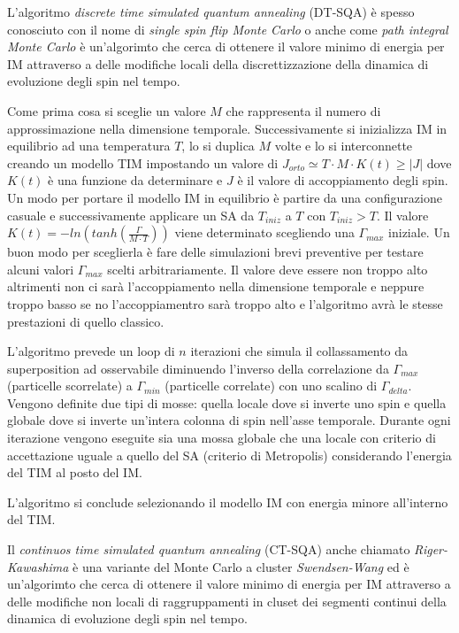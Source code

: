 L'algoritmo \textit{discrete time simulated quantum annealing} (DT-SQA)\cite{QVC} è spesso conosciuto con il nome di \textit{single spin flip Monte Carlo} o anche come \textit{path integral Monte Carlo}\cite{PIMC} è un'algorimto che cerca di ottenere il valore minimo di energia per IM attraverso a delle modifiche locali della discrettizzazione della dinamica di evoluzione degli spin nel tempo.

Come prima cosa si sceglie un valore $M$ che rappresenta il numero di approssimazione nella dimensione temporale.
Successivamente si inizializza IM in equilibrio ad una temperatura $T$, lo si duplica $M$ volte e lo si interconnette creando un modello TIM impostando un valore di $J_{orto} \simeq T \cdot M \cdot K(t) \ge |J|$ dove $K(t)$ è una funzione da determinare e $J$ è il valore di accoppiamento degli spin. Un modo per portare il modello IM in equilibrio è partire da una configurazione casuale e successivamente applicare un SA da $T_{iniz}$ a $T$ con $T_{iniz} > T$.
Il valore $K(t) = -ln(tanh(\frac{\Gamma}{M \cdot T}))$ viene determinato scegliendo una $\Gamma_{max}$ iniziale. Un buon modo per sceglierla è fare delle simulazioni brevi preventive per testare alcuni valori $\Gamma_{max}$ scelti arbitrariamente. Il valore deve essere non troppo alto altrimenti non ci sarà l'accoppiamento nella dimensione temporale e neppure troppo basso se no l'accoppiamentro sarà troppo alto e l'algoritmo avrà le stesse prestazioni di quello classico.

L'algoritmo prevede un loop di $n$ iterazioni che simula il collassamento da superposition ad osservabile diminuendo l'inverso della correlazione da $\Gamma_{max}$ (particelle scorrelate) a $\Gamma_{min}$ (particelle correlate) con uno scalino di $\Gamma_{delta}$.
Vengono definite due tipi di mosse: quella locale dove si inverte uno spin e quella globale dove si inverte un'intera colonna di spin nell'asse temporale.
Durante ogni iterazione vengono eseguite sia una mossa globale che una locale con criterio di accettazione uguale a quello del SA (criterio di Metropolis) considerando l'energia del TIM al posto del IM.

L'algoritmo si conclude selezionando il modello IM con energia minore all'interno del TIM.

Il \textit{continuos time simulated quantum annealing} (CT-SQA)\cite{QVC} anche chiamato \textit{Riger-Kawashima}\cite{CTSQA} è una variante del Monte Carlo a cluster \textit{Swendsen-Wang}\cite{NCD} ed è un'algorimto che cerca di ottenere il valore minimo di energia per IM attraverso a delle modifiche non locali di raggruppamenti in cluset dei segmenti continui della dinamica di evoluzione degli spin nel tempo.

